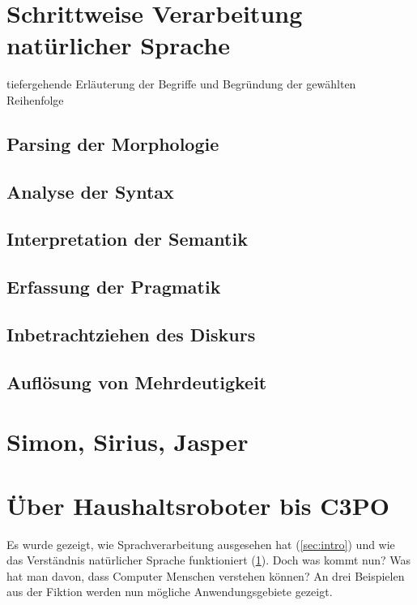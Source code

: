 \documentclass[12pt,twoside]{article}
\theoremstyle{plain}
\theoremstyle{definition}
\theoremstyle{remark}
\begin{document}
\section{Schrittweise Verarbeitung natürlicher Sprache}
\label{sec:meth}
tiefergehende Erläuterung der Begriffe und Begründung der gewählten Reihenfolge

\subsection{Parsing der Morphologie}
\label{ssec:morph}

\subsection{Analyse der Syntax}
\label{ssec:syntax}

\subsection{Interpretation der Semantik}
\label{sec:sem}

\subsection{Erfassung der Pragmatik}
\label{ssec:prag}

\subsection{Inbetrachtziehen des Diskurs}
\label{ssec:disc}

\subsection{Auflösung von Mehrdeutigkeit}
\label{ssec:ambi}

\section{Simon, Sirius, Jasper}
\label{sec:software}

\section{Über Haushaltsroboter bis C3PO}
\label{sec:ausb}
Es wurde gezeigt, wie Sprachverarbeitung ausgesehen hat (\ref{sec:intro}) und wie das Verständnis natürlicher Sprache funktioniert (\ref{sec:meth}).
Doch was kommt nun?
Was hat man davon, dass Computer Menschen verstehen können?
An drei Beispielen aus der Fiktion werden nun mögliche Anwendungsgebiete gezeigt.
\end{document}
